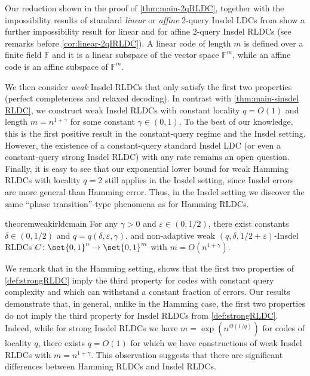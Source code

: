 \documentclass[10pt,a4paper]{article}
\theoremstyle{remark}
\newcommand{\eps}{\ensuremath{\varepsilon}}
\providecommand{\F}{\ensuremath{\mathbb{F}}\xspace}
\begin{document}
Our reduction shown in the proof of \cref{thm:main-2qRLDC},  together with the impossibility results of standard {\em linear} or {\em affine} 2-query Insdel LDCs from \cite{blocki2021exponential} show a further impossibility result for linear and for affine $2$-query Insdel RLDCs (see remarks before \cref{cor:linear-2qIRLDC}). A linear code of length $m$ is defined over a finite field $\F$ and it is a linear subspace of the vector space $\F^m$, while an affine code is an affine subspace of $\F^m$.
 
 
 We then consider {\em weak} Insdel RLDCs that only satisfy the first two properties (perfect completeness and relaxed decoding). In contrast with \cref{thm:main-sinsdel RLDC}, we construct weak Insdel RLDCs with constant locality $q=O(1)$ and length $m=n^{1+\gamma}$ for some constant $\gamma \in (0, 1)$. To the best of our knowledge, this is the first positive result in the constant-query regime and the Insdel setting. However, the existence of a constant-query standard Insdel LDC (or even a constant-query strong Insdel RLDC) with any rate remains an open question. Finally, it is easy to see that our exponential lower bound for weak Hamming RLDCs with locality $q=2$ still applies in the Insdel setting, since Insdel errors are more general than Hamming error. Thus, in the Insdel setting we discover the same ``phase transition''-type phenomena as for Hamming RLDCs.
 
 
 
 

\begin{restatable}{theorem}{weakirldcmain} \label{thm:main-rildc-construction}
	For any $\gamma>0$ and $\eps \in (0,1/2)$, there exist constants $\delta \in (0,1/2)$ and $q=q(\delta,\eps,\gamma)$, and non-adaptive weak $(q,\delta,1/2+\eps)$-Insdel RLDCs $C\colon\set{0,1}^n\rightarrow \set{0,1}^m$ with $m=O(n^{1+\gamma})$. %
\end{restatable}



 

 We remark that in the Hamming setting, \cite{Ben-SassonGHSV06} shows that the first two properties of \cref{def:strongRLDC} imply the third property for codes with constant query complexity and which can withstand a constant fraction of errors.
 Our results demonstrate that, in general, unlike in the Hamming case, the first two properties do not imply the third property for Insdel RLDCs from \cref{def:strongRLDC}. %
 Indeed, while for strong Insdel RLDCs we have $m= \exp(n^{\Omega(1/q)})$  for codes of locality $q$, there exists $q=O(1)$ for which we have constructions of weak Insdel RLDCs with $m=n^{1+\gamma}.$ This observation suggests that there are significant differences between Hamming RLDCs and Insdel RLDCs. 
\end{document}
